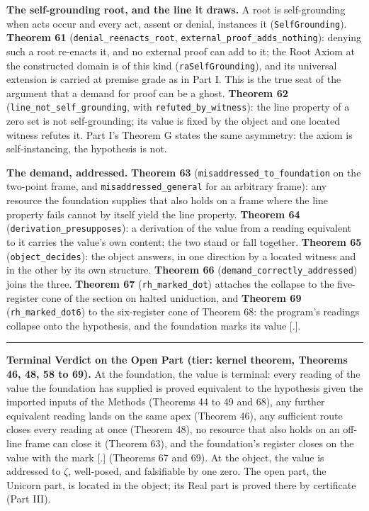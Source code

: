 \documentclass[10pt,twocolumn]{article}
\newcommand{\jboxstart}{\begin{jbox}}
\newenvironment{jbox}{\par\vspace{2pt}\noindent\color{accent}\rule{\columnwidth}{0.8pt}\par\vspace{-2pt}\small}{\par\vspace{2pt}}
\begin{document}
\textbf{The self-grounding root, and the line it draws.} A root is
self-grounding when acts occur and every act, assent or denial,
instances it (\texttt{SelfGrounding}). \textbf{Theorem 61}
(\texttt{denial\_reenacts\_root},
\texttt{external\_proof\_adds\_nothing}): denying such a root re-enacts
it, and no external proof can add to it; the Root Axiom at the
constructed domain is of this kind (\texttt{raSelfGrounding}), and its
universal extension is carried at premise grade as in Part I. This is
the true seat of the argument that a demand for proof can be a ghost.
\textbf{Theorem 62} (\texttt{line\_not\_self\_grounding}, with
\texttt{refuted\_by\_witness}): the line property of a zero set is not
self-grounding; its value is fixed by the object and one located witness
refutes it. Part I's Theorem G states the same asymmetry: the axiom is
self-instancing, the hypothesis is not.

\textbf{The demand, addressed.} \textbf{Theorem 63}
(\texttt{misaddressed\_to\_foundation} on the two-point frame, and
\texttt{misaddressed\_general} for an arbitrary frame): any resource the
foundation supplies that also holds on a frame where the line property
fails cannot by itself yield the line property. \textbf{Theorem 64}
(\texttt{derivation\_presupposes}): a derivation of the value from a
reading equivalent to it carries the value's own content; the two stand
or fall together. \textbf{Theorem 65} (\texttt{object\_decides}): the
object answers, in one direction by a located witness and in the other
by its own structure. \textbf{Theorem 66}
(\texttt{demand\_correctly\_addressed}) joins the three. \textbf{Theorem
67} (\texttt{rh\_marked\_dot}) attaches the collapse to the
five-register cone of the section on halted uniduction, and
\textbf{Theorem 69} (\texttt{rh\_marked\_dot6}) to the six-register cone
of Theorem 68: the program's readings collapse onto the hypothesis, and
the foundation marks its value {[}.{]}.

\jboxstart

\textbf{Terminal Verdict on the Open Part (tier: kernel theorem,
Theorems 46, 48, 58 to 69).} At the foundation, the value is terminal:
every reading of the value the foundation has supplied is proved
equivalent to the hypothesis given the imported inputs of the Methods
(Theorems 44 to 49 and 68), any further equivalent reading lands on the
same apex (Theorem 46), any sufficient route closes every reading at
once (Theorem 48), no resource that also holds on an off-line frame can
close it (Theorem 63), and the foundation's register closes on the value
with the mark {[}.{]} (Theorems 67 and 69). At the object, the value is
addressed to \(\zeta\), well-posed, and falsifiable by one zero. The
open part, the Unicorn part, is located in the object; its Real part is
proved there by certificate (Part III).
\end{document}
